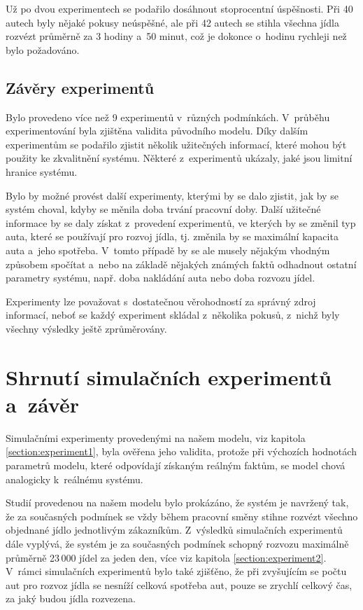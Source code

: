 \documentclass[a4paper, 11pt]{article}
\begin{document}
	Už po dvou experimentech se podařilo dosáhnout stoprocentní úspěšnosti. Při
	40 autech byly nějaké pokusy neúspěšné, ale při 42 autech se stihla všechna
	jídla rozvézt průměrně za 3 hodiny a~50 minut, což je dokonce o~hodinu
	rychleji než bylo požadováno.


	\subsection{Závěry experimentů}

	Bylo provedeno více než 9 experimentů v~různých podmínkách. V~průběhu
	experimentování byla zjištěna validita původního modelu. Díky dalším
	experimentům se podařilo zjistit několik užitečných informací, které
	mohou být použity ke zkvalitnění systému. Některé z~experimentů ukázaly,
	jaké jsou limitní hranice systému.

	Bylo by možné provést další experimenty, kterými by se dalo zjistit,
	jak by se systém choval, kdyby se měnila doba trvání pracovní doby.
	Další užitečné informace by se daly získat z~provedení experimentů,
	ve kterých by se změnil typ auta, které se používají pro rozvoj jídla,
	tj. změnila by se maximální kapacita auta a~jeho spotřeba. V~tomto
	případě by se ale musely nějakým vhodným způsobem spočítat a~nebo na
	základě nějakých známých faktů odhadnout ostatní parametry systému, např.
	doba nakládání auta nebo doba rozvozu jídel.

	Experimenty lze považovat s~dostatečnou věrohodností za správný zdroj
	informací, neboť se každý experiment skládal z~několika pokusů, z~nichž
	byly všechny výsledky ještě zprůměrovány.



	\section{Shrnutí simulačních experimentů a~závěr}

	Simulačními experimenty provedenými na našem modelu, viz
	kapitola \ref{section:experiment1}, byla ověřena jeho validita, protože
	při výchozích hodnotách parametrů modelu, které odpovídají získaným
	reálným faktům, se model chová analogicky k~reálnému systému.

	Studií provedenou na našem modelu bylo prokázáno, že systém je navržený
	tak, že za současných podmínek se vždy během pracovní směny stihne
	rozvézt všechno objednané jídlo jednotlivým zákazníkům. Z~výsledků
	simulačních experimentů dále vyplývá, že systém je za současných
	podmínek schopný rozvozu maximálně průměrně 23\,000 jídel za jeden den,
	více viz kapitola \ref{section:experiment2}. V~rámci simulačních
	experimentů bylo také zjišťěno, že při zvyšujícím se počtu aut pro
	rozvoz jídla se nesníží celková spotřeba aut, pouze se zrychlí celkový
	čas, za jaký budou jídla rozvezena.
\end{document}
